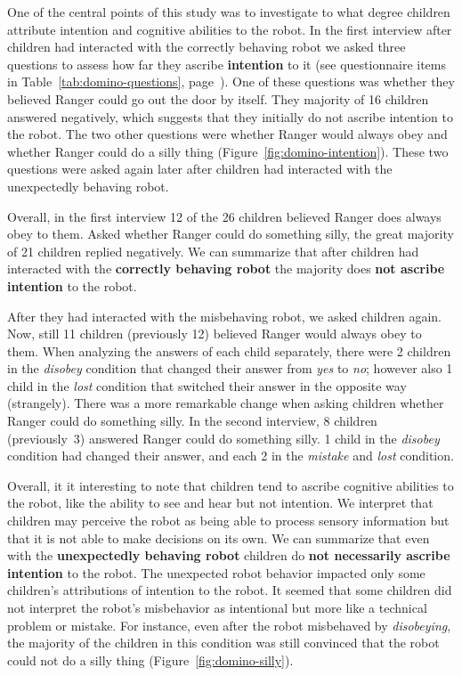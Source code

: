 \documentclass{sig-alternate}
\begin{document}
One of the central points of this study was to investigate to what degree
children attribute intention and cognitive abilities to the robot.  In the first
interview after children had interacted with the correctly behaving robot we
asked three questions to assess how far they ascribe \textbf{intention} to it
(see questionnaire items in Table~\ref{tab:domino-questions},
page~\pageref{tab:domino-questions}). One of these questions was whether they
believed Ranger could go out the door by itself. They majority of 16 children
answered negatively, which suggests that they initially do not ascribe intention
to the robot. The two other questions were whether Ranger would always obey and
whether Ranger could do a silly thing (Figure~\ref{fig:domino-intention}). These
two questions were asked again later after children had interacted with the
unexpectedly behaving robot.


Overall, in the first interview 12 of the 26 children believed Ranger does
always obey to them. Asked whether Ranger could do something silly, the great
majority of 21 children replied negatively. We can summarize that after children
had interacted with the \textbf{correctly behaving robot} the majority does
\textbf{not ascribe intention} to the robot.

After they had interacted with the misbehaving robot, we asked children again.
Now, still 11 children (previously 12) believed Ranger would always obey to
them. When analyzing the answers of each child separately, there were 2 children
in the \textit{disobey} condition that changed their answer from \textit{yes} to
\textit{no}; however also 1 child in the \textit{lost} condition that switched
their answer in the opposite way (strangely). There was a more remarkable change
when asking children whether Ranger could do something silly. In the second
interview, 8 children (previously~3) answered Ranger could do something silly. 1
child in the \textit{disobey} condition had changed their answer, and each 2 in
the \textit{mistake} and \textit{lost} condition. 

Overall, it it interesting to note that children tend to ascribe cognitive
abilities to the robot, like the ability to see and hear but not intention. We
interpret that children may perceive the robot as being able to process sensory
information but that it is not able to make decisions on its own. We can
summarize that even with the \textbf{unexpectedly behaving robot} children do
\textbf{not necessarily ascribe intention} to the robot. The unexpected robot
behavior impacted only some children's attributions of intention to the robot.
It seemed that some children did not interpret the robot's misbehavior as
intentional but more like a technical problem or mistake. For instance, even
after the robot misbehaved by \textit{disobeying}, the majority of the children
in this condition was still convinced that the robot could not do a silly thing
(Figure~\ref{fig:domino-silly}).
\end{document}
